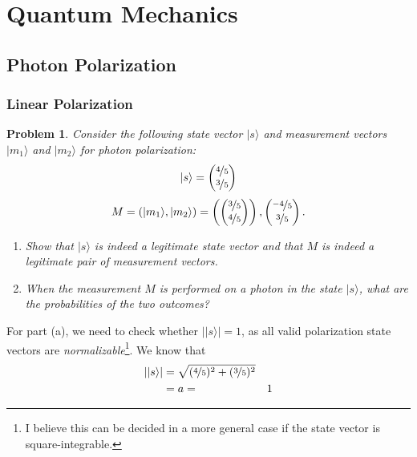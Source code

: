 \documentclass[12pt]{article}
\newenvironment{answer}
    {\begin{adjustwidth}{0pt}{0pt}}
    {\end{adjustwidth}}
\newtheorem{problem}{Problem}
\theoremstyle{remark}  %
\begin{document}
\setlength{\abovecaptionskip}{0pt} %

\rhead{\today}

\setcounter{section}{1}
\section{Quantum Mechanics}
\subsection{Photon Polarization}
\subsubsection{Linear Polarization}
    \begin{problem}
        Consider the following state vector $|s\rangle$ and measurement vectors $|m_1\rangle$ and $|m_2\rangle$ for photon polarization: $$|s\rangle = \begin{pmatrix}
            \nicefrac{4}{5} \\
            \nicefrac{3}{5}
        \end{pmatrix}$$ $$ M = (|m_1\rangle,|m_2\rangle) = \left(\begin{pmatrix}
            \nicefrac{3}{5} \\
            \nicefrac{4}{5}
        \end{pmatrix}\right), \begin{pmatrix}
            \nicefrac{-4}{5} \\
            \nicefrac{3}{5}
        \end{pmatrix}.$$
        \begin{enumerate}[label=(\alph*)]
            \item Show that $|s\rangle$ is indeed a legitimate state vector and that $M$ is indeed a legitimate pair of measurement vectors.
            \item When the measurement $M$ is performed on a photon in the state $|s\rangle$, what are the probabilities of the two outcomes?
        \end{enumerate}
    \end{problem}
    \begin{answer}
        For part (a), we need to check whether $||s\rangle|=1$, as all valid polarization state vectors are \emph{normalizable}\footnote{I believe this can be decided in a more general case if the state vector is square-integrable.}. We know that \begin{align*}
            ||s\rangle| &= \sqrt{(\nicefrac{4}{5})^2 + (\nicefrac{3}{5})^2} \\
            &= a ={}& 1
        \end{align*}
    \end{answer}
\end{document}
